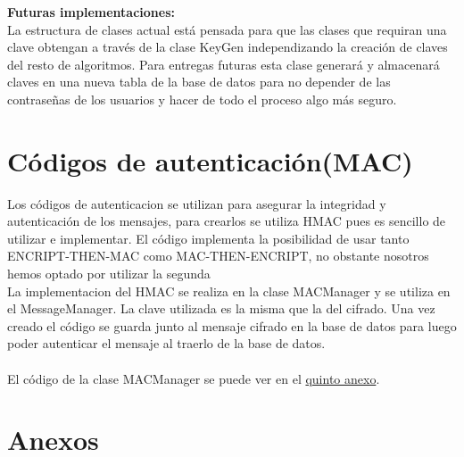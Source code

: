 \documentclass[a4paper,11pt]{article}
\begin{document}
\textbf{Futuras implementaciones:}\\ 
La estructura de clases actual está pensada para que las clases que requiran una clave obtengan a través de la clase KeyGen independizando la creación de claves del resto de algoritmos. Para entregas futuras esta clase generará y almacenará claves en una nueva tabla de la base de datos para no depender de las contraseñas de los usuarios y hacer de todo el proceso algo más seguro. 

\section{Códigos de autenticación(MAC)}
Los códigos de autenticacion se utilizan para asegurar la integridad y autenticación de los mensajes, para crearlos se utiliza HMAC pues es sencillo de utilizar e implementar. El código implementa la posibilidad de usar tanto ENCRIPT-THEN-MAC como MAC-THEN-ENCRIPT, no obstante nosotros hemos optado por utilizar la segunda\\ 
La implementacion del HMAC se realiza en la clase MACManager y se utiliza en el MessageManager. La clave utilizada es la misma que la del cifrado. Una vez creado el código se guarda junto al mensaje cifrado en la base de datos para luego poder autenticar el mensaje al traerlo de la base de datos.\\\\
El código de la clase MACManager se puede ver en el  \hyperref[sec:HMACCode]{quinto anexo}.



\newpage
\section{Anexos}
\centering
\end{document}
